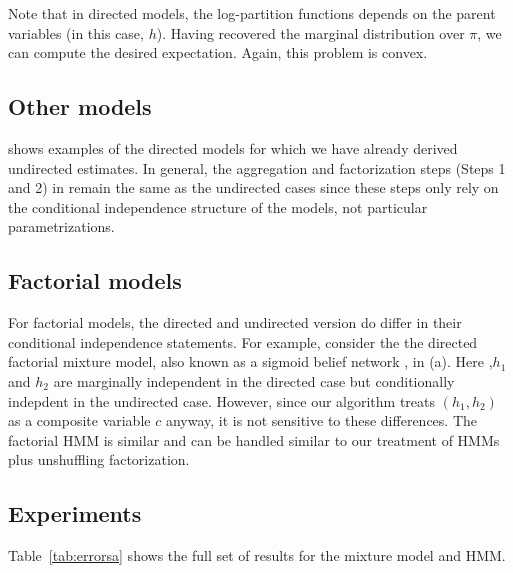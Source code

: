 Note that in directed models, the log-partition functions depends on the parent variables (in this case, $h$).
Having recovered the marginal distribution over $\pi$, we can compute the desired expectation.
Again, this problem is convex.



\subsection{Other models}

 shows examples of the directed models
for which we have already derived undirected estimates.
In general, the aggregation
and factorization steps (Steps 1 and 2) in 
remain the same as the undirected cases since these steps
only rely on the conditional independence structure of the models,
not particular parametrizations.

\subsection{Factorial models}

For factorial models, the directed and undirected version do differ in their
conditional independence statements.
For example, consider the 
the directed factorial mixture model,
also known as a sigmoid belief network \citep{saul96sigmoid},
in (a).
Here ,$h_1$ and $h_2$ are marginally independent in the directed
case but conditionally indepdent in the undirected case.
However, since our algorithm treats $(h_1,h_2)$ as a composite variable $c$
anyway, it is not sensitive to these differences.
The factorial HMM \cite{ghahramani97fhmm} is similar and can be handled
similar to our treatment of HMMs plus unshuffling factorization.

\subsection{Experiments}

Table~\ref{tab:errorsa} shows the full set of results for the mixture
model and HMM.

